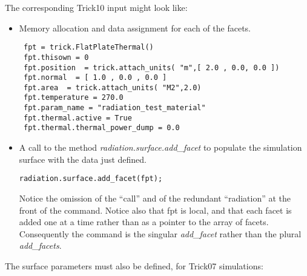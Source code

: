 The corresponding Trick10 input might look like:
\begin{itemize}
\item{} Memory allocation and data assignment for each of the facets.
\begin{verbatim}
 fpt = trick.FlatPlateThermal()
 fpt.thisown = 0
 fpt.position  = trick.attach_units( "m",[ 2.0 , 0.0, 0.0 ])
 fpt.normal  = [ 1.0 , 0.0 , 0.0 ]
 fpt.area  = trick.attach_units( "M2",2.0)
 fpt.temperature = 270.0
 fpt.param_name = "radiation_test_material"
 fpt.thermal.active = True
 fpt.thermal.thermal_power_dump = 0.0
\end{verbatim}
 \item{} A call to the method \textit{radiation.surface.add\_facet} to populate the simulation surface with the data just defined.
\begin{verbatim}
radiation.surface.add_facet(fpt);
\end{verbatim}
Notice the omission of the ``call'' and of the redundant ``radiation'' at the front of the command.  Notice also that fpt is local, and that each facet is added one at a time rather than as a pointer to the array of facets.  Consequently the command is the singular \textit{add\_facet} rather than the plural \textit{add\_facets}.
\end{itemize}

The surface parameters must also be defined, for Trick07 simulations:

